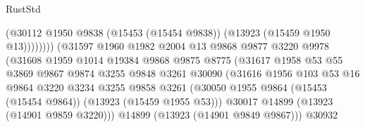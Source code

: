 \begin{lexlean}{RustStd}
\begin{coremodule}
                                            (@30112
                                              @1950
                                              @9838
                                              (@15453 (@15454 @9838))
                                              (@13923 (@15459 @1950 @13))))))))
                                  (@31597
                                    @1960
                                    @1982
                                    @2004
                                    @13
                                    @9868
                                    @9877
                                    @3220
                                    @9978
                                    (@31608
                                      @1959
                                      @1014
                                      @19384
                                      @9868
                                      @9875
                                      @8775
                                      (@31617
                                        @1958
                                        @53
                                        @55
                                        @3869
                                        @9867
                                        @9874
                                        @3255
                                        @9848
                                        @3261
                                        @30090
                                        (@31616
                                          @1956
                                          @103
                                          @53
                                          @16
                                          @9864
                                          @3220
                                          @3234
                                          @3255
                                          @9858
                                          @3261
                                          (@30050
                                            @1955
                                            @9864
                                            (@15453 (@15454 @9864))
                                            (@13923 (@15459 @1955 @53)))
                                          @30017
                                          @14899
                                          (@13923 (@14901 @9859 @3220)))
                                        @14899
                                        (@13923 (@14901 @9849 @9867)))
                                      @30932

\end{coremodule}
\end{lexlean}
